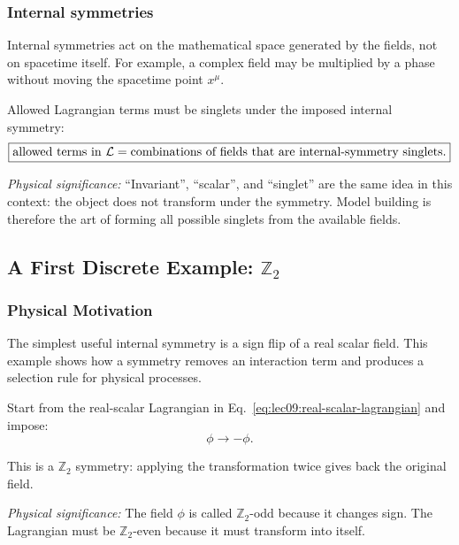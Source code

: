\documentclass[../main.tex]{subfiles}
\begin{document}
\subsubsection*{Internal symmetries}

Internal symmetries act on the mathematical space generated by the fields, not on spacetime itself.  For example, a complex field may be multiplied by a phase without moving the spacetime point $x^\mu$.

Allowed Lagrangian terms must be singlets under the imposed internal symmetry:
\begin{equation}
  \boxed{
  \text{allowed terms in }\mathcal{L}
  =
  \text{combinations of fields that are internal-symmetry singlets.}}
  \label{eq:lec09:singlet-rule}
\end{equation}

\textit{Physical significance:} ``Invariant'', ``scalar'', and ``singlet'' are the same idea in this context: the object does not transform under the symmetry.  Model building is therefore the art of forming all possible singlets from the available fields.

\subsection*{A First Discrete Example: $\mathbb{Z}_2$}

\subsubsection*{Physical Motivation}

The simplest useful internal symmetry is a sign flip of a real scalar field.  This example shows how a symmetry removes an interaction term and produces a selection rule for physical processes.

Start from the real-scalar Lagrangian in Eq.~\eqref{eq:lec09:real-scalar-lagrangian} and impose:
\begin{equation}
  \boxed{
  \phi \longrightarrow -\phi.}
  \label{eq:lec09:z2-transformation}
\end{equation}

This is a $\mathbb{Z}_2$ symmetry: applying the transformation twice gives back the original field.

\textit{Physical significance:} The field $\phi$ is called $\mathbb{Z}_2$-odd because it changes sign.  The Lagrangian must be $\mathbb{Z}_2$-even because it must transform into itself.
\end{document}
